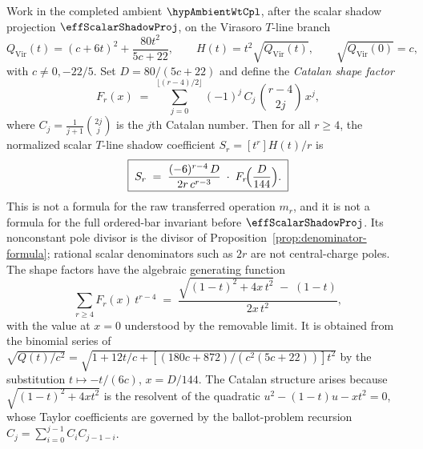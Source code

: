 \begin{theorem}
\label{thm:shadow-closed-form}%
%
%
Work in the completed ambient \(\hypAmbientWtCpl\), after the scalar
shadow projection \(\effScalarShadowProj\), on the Virasoro \(T\)-line
branch
\[
Q_{\mathrm{Vir}}(t)
=(c+6t)^2+\frac{80t^2}{5c+22},\qquad
H(t)=t^2\sqrt{Q_{\mathrm{Vir}}(t)},\qquad
\sqrt{Q_{\mathrm{Vir}}(0)}=c ,
\]
with \(c\ne0,-22/5\).  Set $D = 80/(5c+22)$ and define the
\emph{Catalan shape factor}
\begin{equation}\label{eq:catalan-shape-factor}
F_r(x)
\;=\;
\sum_{j=0}^{\lfloor(r-4)/2\rfloor}
(-1)^j\, C_j \,\binom{r-4}{2j}\, x^j,
\end{equation}
where $C_j = \frac{1}{j+1}\binom{2j}{j}$ is the $j$th Catalan
number. Then for all $r \ge 4$, the normalized scalar \(T\)-line
shadow coefficient \(S_r=[t^r]H(t)/r\) is
\begin{equation}\label{eq:shadow-closed-form}
\boxed{\;
S_r
\;=\;
\frac{(-6)^{r-4}\,D}{2r\,c^{r-3}}
\;\cdot\;
F_r\!\Bigl(\frac{D}{144}\Bigr).
\;}
\end{equation}
This is not a formula for the raw transferred operation \(m_r\), and it
is not a formula for the full ordered-bar invariant before
\(\effScalarShadowProj\). Its nonconstant pole divisor is the divisor of
Proposition~\ref{prop:denominator-formula}; rational scalar
denominators such as \(2r\) are not central-charge poles.
The shape factors have the algebraic generating function
\begin{equation}\label{eq:shape-factor-gf}
\sum_{r \ge 4} F_r(x)\, t^{r-4}
\;=\;
\frac{\sqrt{(1-t)^2 + 4x\,t^2} \;-\; (1-t)}{2x\,t^2},
\end{equation}
with the value at \(x=0\) understood by the removable limit.  It is
obtained from the binomial series of
$\sqrt{Q(t)/c^2} = \sqrt{1 + 12t/c + [(180c+872)/(c^2(5c+22))]t^2}$
by the substitution $t \mapsto -t/(6c)$, $x = D/144$.
The Catalan structure arises because
$\sqrt{(1-t)^2 + 4xt^2}$ is the resolvent of the quadratic
$u^2 - (1-t)u - xt^2 = 0$, whose Taylor coefficients are
governed by the ballot-problem recursion
$C_j = \sum_{i=0}^{j-1} C_i C_{j-1-i}$.
\end{theorem}

